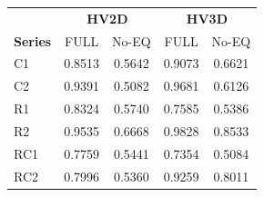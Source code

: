 \begin{tabular}{l|cc|cc}
\toprule
& \multicolumn{2}{c|}{\textbf{HV2D}} & \multicolumn{2}{c}{\textbf{HV3D}} \\
\textbf{Series} & FULL & No-EQ & FULL & No-EQ \\
\midrule
C1 & 0.8513 & 0.5642 & 0.9073 & 0.6621 \\
C2 & 0.9391 & 0.5082 & 0.9681 & 0.6126 \\
R1 & 0.8324 & 0.5740 & 0.7585 & 0.5386 \\
R2 & 0.9535 & 0.6668 & 0.9828 & 0.8533 \\
RC1 & 0.7759 & 0.5441 & 0.7354 & 0.5084 \\
RC2 & 0.7996 & 0.5360 & 0.9259 & 0.8011 \\
\bottomrule
\end{tabular}
